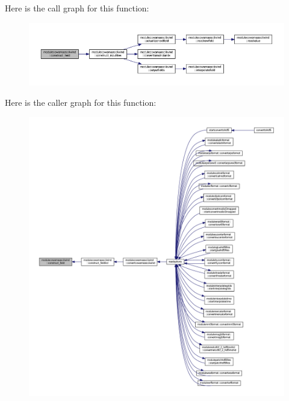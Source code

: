 Here is the call graph for this function\+:\nopagebreak
\begin{figure}[H]
\begin{center}
\leavevmode
\includegraphics[width=350pt]{namespacemodulecowamaasciiwind_a661012c07a9e926668c44de9bfc8e1ae_cgraph}
\end{center}
\end{figure}
Here is the caller graph for this function\+:\nopagebreak
\begin{figure}[H]
\begin{center}
\leavevmode
\includegraphics[width=350pt]{namespacemodulecowamaasciiwind_a661012c07a9e926668c44de9bfc8e1ae_icgraph}
\end{center}
\end{figure}
\mbox{\label{namespacemodulecowamaasciiwind_a473204a88af20d0403e8a3f6d6230232}} 
